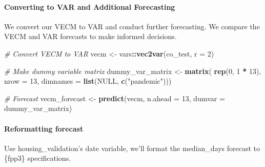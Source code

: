 \documentclass[
]{article}
\newenvironment{Shaded}{\begin{snugshade}}{\end{snugshade}}
\newcommand{\AttributeTok}[1]{\textcolor[rgb]{0.13,0.29,0.53}{#1}}
\newcommand{\CommentTok}[1]{\textcolor[rgb]{0.56,0.35,0.01}{\textit{#1}}}
\newcommand{\ConstantTok}[1]{\textcolor[rgb]{0.56,0.35,0.01}{#1}}
\newcommand{\DecValTok}[1]{\textcolor[rgb]{0.00,0.00,0.81}{#1}}
\newcommand{\FunctionTok}[1]{\textcolor[rgb]{0.13,0.29,0.53}{\textbf{#1}}}
\newcommand{\NormalTok}[1]{#1}
\newcommand{\OtherTok}[1]{\textcolor[rgb]{0.56,0.35,0.01}{#1}}
\newcommand{\SpecialCharTok}[1]{\textcolor[rgb]{0.81,0.36,0.00}{\textbf{#1}}}
\newcommand{\StringTok}[1]{\textcolor[rgb]{0.31,0.60,0.02}{#1}}
\begin{document}
\hypertarget{converting-to-var-and-additional-forecasting}{%
\paragraph{Converting to VAR and Additional
Forecasting}\label{converting-to-var-and-additional-forecasting}}

We convert our VECM to VAR and conduct further forecasting. We compare
the VECM and VAR forecasts to make informed decisions.

\begin{Shaded}
\begin{Highlighting}[]
\CommentTok{\# Convert VECM to VAR}
\NormalTok{vecm }\OtherTok{\textless{}{-}}\NormalTok{ vars}\SpecialCharTok{::}\FunctionTok{vec2var}\NormalTok{(co\_test, }\AttributeTok{r =} \DecValTok{2}\NormalTok{)}

\CommentTok{\# Make dummy variable matrix}
\NormalTok{dummy\_var\_matrix }\OtherTok{\textless{}{-}} \FunctionTok{matrix}\NormalTok{(}
  \FunctionTok{rep}\NormalTok{(}\DecValTok{0}\NormalTok{, }\DecValTok{1} \SpecialCharTok{*} \DecValTok{13}\NormalTok{), }\AttributeTok{nrow =} \DecValTok{13}\NormalTok{,}
  \AttributeTok{dimnames =} \FunctionTok{list}\NormalTok{(}\ConstantTok{NULL}\NormalTok{, }\FunctionTok{c}\NormalTok{(}\StringTok{"pandemic"}\NormalTok{)))}

\CommentTok{\# Forecast}
\NormalTok{vecm\_forecast }\OtherTok{\textless{}{-}} \FunctionTok{predict}\NormalTok{(vecm, }\AttributeTok{n.ahead =} \DecValTok{13}\NormalTok{, }\AttributeTok{dumvar =}\NormalTok{ dummy\_var\_matrix)}
\end{Highlighting}
\end{Shaded}

\hypertarget{reformatting-forecast-1}{%
\paragraph{Reformatting forecast}\label{reformatting-forecast-1}}

Use housing\_validation's date variable, we'll format the median\_days
forecast to \{fpp3\} specifications.
\end{document}

